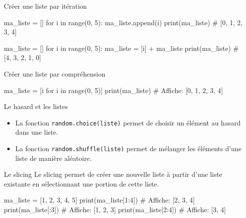 \begin{easybox}{Créer une liste par itération}{}

\begin{minipage}{0.48\linewidth}
		\begin{CodePythontexAlt}[TaillePolice=\normalsize, Largeur=1\linewidth,Centre,PremLigne=1, Lignes=false]{}
ma_liste = []
for i in range(0, 5):
	ma_liste.append(i)
print(ma_liste)	# [0, 1, 2, 3, 4]
		\end{CodePythontexAlt}
	\end{minipage}\hfill
	\begin{minipage}{0.48\linewidth}
		\begin{CodePythontexAlt}[TaillePolice=\normalsize, Largeur=1\linewidth,Centre,PremLigne=1, Lignes=false]{}
ma_liste = []
for i in range(0, 5):
	ma_liste = [i] + ma_liste
print(ma_liste) # [4, 3, 2, 1, 0]
		
		\end{CodePythontexAlt}
	\end{minipage}
\end{easybox}

\begin{easybox}{Créer une liste par compréhension}{}

	\begin{CodePythontexAlt}[TaillePolice=\normalsize, Largeur=1\linewidth,Centre,PremLigne=1, Lignes=false]{}
ma_liste = [i for i in range(0, 5)]
print(ma_liste) # Affiche: [0, 1, 2, 3, 4]
		\end{CodePythontexAlt}
		\end{easybox}


	
\begin{easybox}{Le hasard et les listes}{}
	\begin{itemize}
		\item La fonction \verb|random.choice(liste)| permet de choisir un élément au hasard dans une liste.
		\item La fonction \verb|random.shuffle(liste)| permet de mélanger les éléments d'une liste de manière aléatoire.
	\end{itemize}
\end{easybox}

\begin{easybox}{Le slicing}{}
	Le slicing permet de créer une nouvelle liste à partir d'une liste existante en sélectionnant une portion de cette liste.

	\begin{CodePythontexAlt}[TaillePolice=\normalsize, Largeur=1\linewidth,Centre,PremLigne=1, Lignes=false]{}
ma_liste = [1, 2, 3, 4, 5]
print(ma_liste[1:4])	# Affiche: [2, 3, 4]
print(ma_liste[:3])	 # Affiche: [1, 2, 3]
print(ma_liste[2:4])	# Affiche: [3, 4]
		\end{CodePythontexAlt}
\end{easybox}

